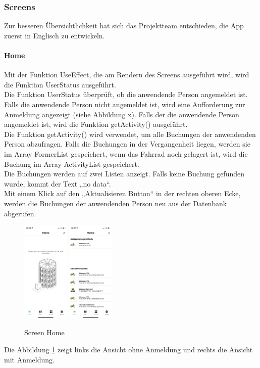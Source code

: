 \subsubsection{Screens}Zur besseren Übersichtlichkeit hat sich das Projektteam entschieden, die App zuerst in Englisch zu entwickeln.\\

\paragraph{Home}Mit der Funktion UseEffect, die am Rendern des Screens ausgeführt wird, wird die Funktion UserStatus ausgeführt.\\
Die Funktion UserStatus überprüft, ob die anwendende Person angemeldet ist. Falls die anwendende Person nicht angemeldet ist, wird eine Aufforderung zur Anmeldung angezeigt (siehe Abbildung x). Falls der die anwendende Person angemeldet ist, wird die Funktion getActivity() ausgeführt. \\
Die Funktion getActivity() wird verwendet, um alle Buchungen der anwendenden Person abzufragen. Falls die Buchungen in der Vergangenheit liegen, werden sie im \Gls{Array} FormerList gespeichert, wenn das Fahrrad noch gelagert ist, wird die Buchung im \Gls{Array} ActivityList gespeichert. \\
Die Buchungen werden auf zwei Listen anzeigt. Falls keine Buchung gefunden wurde, kommt der Text „no data“. \\
Mit einem Klick auf den „Aktualisieren Button“ in der rechten oberen Ecke, werden die Buchungen der anwendenden Person neu aus der Datenbank abgerufen.\\
\begin{figure}[H]
  \centering
  \includegraphics[width=0.2\textwidth]{images/app-screenshots/screenhomeno.png}
  \includegraphics[width=0.2\textwidth]{images/app-screenshots/screenhomeyes.png}
  \caption{Screen Home}
  \label{fig:screenhome}
\end{figure}
Die Abbildung \ref{fig:screenhome} zeigt links die Ansicht ohne Anmeldung und rechts die Ansicht mit Anmeldung.


